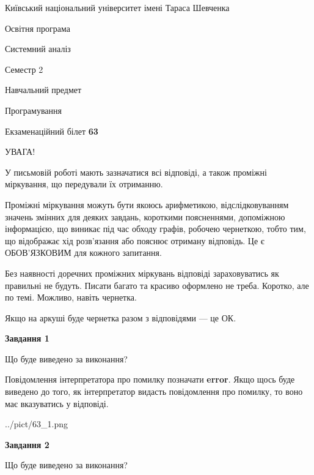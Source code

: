 \documentclass[12pt, ukrainian]{article}
\begin{document}
{{\begin {small}\par
{ \center  Київський національний університет імені Тараса Шевченка \par}
{\parbox {5 cm}{Освітня програма \hfill}{\parbox {7 cm}{Системний аналіз \hfill}}\parbox {6 cm}{\hfill Семестр 2}}\par
{\parbox {5 cm} {Навчальний предмет \hfill}\parbox {7 cm}{Програмування \hfill}\parbox {6cm}{\hfill}\par}\vspace{-7pt} \end{small}}{\center Екзаменаційний білет \No \textbf
{ 63 }\par}}
{
\begin {large}
УВАГА!

У письмовій роботі мають зазначатися всі відповіді, а також проміжні міркування, що передували їх отриманню.

Проміжні міркування можуть бути якоюсь арифметикою, відслідковуванням зна\-чень змінних для деяких завдань,
короткими поясненнями, допоміжною інформацією, що виникає під час обходу графів, робочею чернеткою,
тобто тим, що відображає хід розв’язання або пояснює отриману відповідь.
Це є ОБОВ’ЯЗКОВИМ для кожного запитання.

Без наявності доречних проміжних міркувань відповіді зараховуватись як правиль\-ні не будуть.
Писати багато та красиво оформлено не треба. Коротко, але по темі. Можли\-во, навіть чернетка.

Якщо на аркуші буде чернетка разом з відповідями --- це ОК.

\newpage

{\begin {center}\textbf{Завдання 1}\end {center}}\par
Що буде виведено за виконання?

Повідомлення інтерпретатора про помилку позначати \textbf{error}.
Якщо щось буде виведено до того, як інтерпретатор видасть повідомлення про помилку, 
то воно має вказуватись у відповіді. \par


\begin{center}
	{../pict/63_1.png}
\end{center}
\newpage

{\begin {center}\textbf{Завдання 2}\end {center}}\par
Що буде виведено за виконання?


\end{large}}
\end{document}
